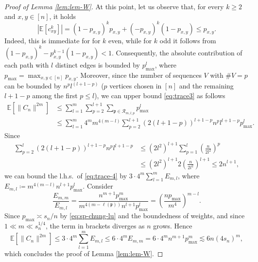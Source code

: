 \documentclass[11pt,oneside]{amsart}
\theoremstyle{plain}
\numberwithin{equation}{section}
\newcommand{\lhs}{{l.h.s.~}}
\newcommand{\E}{\mathbb{E}}
\newcommand{\centeredentry}{{c}}
\newcommand{\centered}{C_n}
\newcommand{\pat}{\mathfrak{p}}
\newcommand{\scaling}{s_n}
\begin{document}
\begin{proof}[Proof of Lemma \ref{lem:lem-W}]
At this point, let us observe that, for every $k\ge 2$ and $x,y \in [n]$, it holds
\begin{equation}
    \left|\E[\centeredentry_{xy}^k]\right|=(1-p_{x,y})^kp_{x,y}+(-p_{x,y})^k (1-p_{x,y}) \le p_{x,y}.
\end{equation}
Indeed, this is immediate for for $k$ even, while for $k$ odd it follows from $(1-p_{x,y})^{k}-p_{x,y}^{k-1}(1-p_{x,y})<1$.
Consequently, the absolute contribution of each path with $l$ distinct edges is bounded by $p_{\max}^l$, where $p_{\max}=\max_{x,y \in [n]} p_{x,y}$.
Moreover, since the number of sequences $V$ with $\#V=p$ can be bounded by $n^{p} l^{(l+1-p)}$ ($p$ vertices chosen in $[n]$ and the remaining $l+1-p$ among the first $p\le l$), we can upper bound \eqref{eq:trace3} as follows
\begin{equation} \label{eq:trace-4}
    \begin{split}
        \E[\|\centered\|^{2m}]
        &\le \sum_{l=1}^m \sum_{p=2}^{l+1}\sum_{\pat \in \mathcal{R}_{m,l,p}} p_{\max}^l\\
        &\le \sum_{l=1}^m 4^m m^{4(m-l)}\sum_{p=2}^{l+1} (2 (l+1-p))^{l+1-p} n^{p} l^{l+1-p}p_{\max}^l.
    \end{split}
\end{equation}
Since 
\begin{equation*}
\begin{split}
    \sum_{p=2}^{l} (2 (l+1-p))^{l+1-p} n^{p} l^{l+1-p}
    &\le \left(2{l^{2}} \right)^{l+1} \sum_{p=1}^{l} \left(\frac{n}{2l^2}\right)^p \\
    &\le  \left(2{l^{2}} \right)^{l+1} 2 \left(\frac{n}{2l^2}\right)^{l+1}\le 2n^{l+1},
\end{split}
\end{equation*}
we can bound the \lhs of \eqref{eq:trace-4} by 
$3\cdot 4^m \sum_{l=1}^m E_{m,l}$, where $E_{m,l} \coloneqq m^{4(m-l)} n^{l+1}p_{\max}^l$. 
Consider
\begin{equation}
    {\frac{E_{m,m}}{E_{m,l}}}= {\frac{n^{m+1}p_{\max}^m}{m^{4(m-{\ell(\pat)})} n^{l+1}p_{\max}^l}}=\left(\frac{n p_{\max}}{m^4}\right)^{m-l}.
\end{equation}
Since $p_{\max}\asymp \scaling/n$ by \eqref{eq:sp-chung-lu} and the boundedness of weights, and since $1\ll m\ll \scaling^{1/4}$, the term in brackets diverges as $n$ grows. Hence
$$ \E[\|\centered\|^{2m}]\le 3 \cdot4^m  \sum_{l=1}^m E_{m,l} \le 6 \cdot4^m  E_{m,m}= 6 \cdot 4^m n^{m+1} p_{\max}^m \lesssim 6 n(4\scaling)^m,$$
which concludes the proof of Lemma \ref{lem:lem-W}.
\end{proof}
\end{document}
